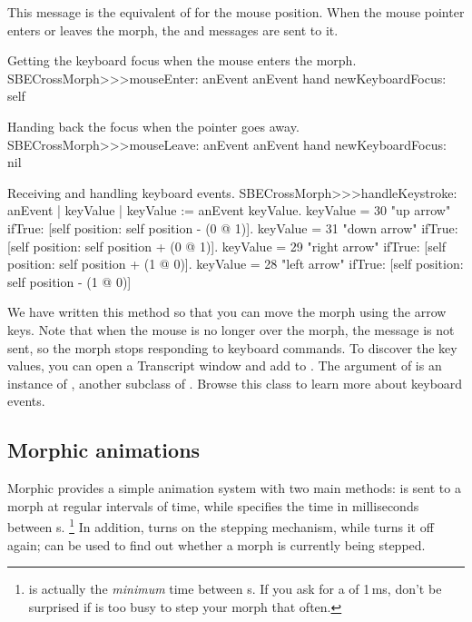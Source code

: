 \documentclass[a4paper,10pt,twoside]{book}
\begin{document}
\noindent
This message is the equivalent of  for the mouse position.
When the mouse pointer enters or leaves the morph, the  and  messages are sent to it.

\begin{method}{Getting the keyboard focus when the mouse enters the morph.}
SBECrossMorph>>>mouseEnter: anEvent
	anEvent hand newKeyboardFocus: self
\end{method}

\begin{method}{Handing back the focus when the pointer goes away.}
SBECrossMorph>>>mouseLeave: anEvent
	anEvent hand newKeyboardFocus: nil
\end{method}

\begin{method}[handleKeystroke]{Receiving and handling keyboard events.}
SBECrossMorph>>>handleKeystroke: anEvent
	| keyValue |
	keyValue := anEvent keyValue.
	keyValue = 30	 "up arrow"
		ifTrue: [self position: self position - (0 @ 1)].
	keyValue = 31	 "down arrow"
		ifTrue: [self position: self position + (0 @ 1)].
	keyValue = 29	 "right arrow"
		ifTrue: [self position: self position + (1 @ 0)].
	keyValue = 28	 "left arrow"
		ifTrue: [self position: self position - (1 @ 0)]
\end{method}

We have written this method so that you can move the morph using the arrow keys.
Note that when the mouse is no longer over the morph, the  message is not sent, so the morph stops responding to keyboard commands.
To discover the key values, you can open a Transcript window and add   to .
The  argument of  is an instance of , another subclass of . Browse this class to learn more about keyboard events.

\subsection{Morphic animations}

Morphic provides a simple animation system with two main methods:  is sent to a morph at regular intervals of time, while  specifies the time in milliseconds between s.%
\footnote{ is actually the \emph{minimum} time between s.
	If you ask for a  of 1\,ms, don't be surprised if \sq is too busy to step your morph that often.}
In addition,  turns on the stepping mechanism, while  turns it off again;   can be used to find out whether a morph is currently being stepped.
\end{document}
